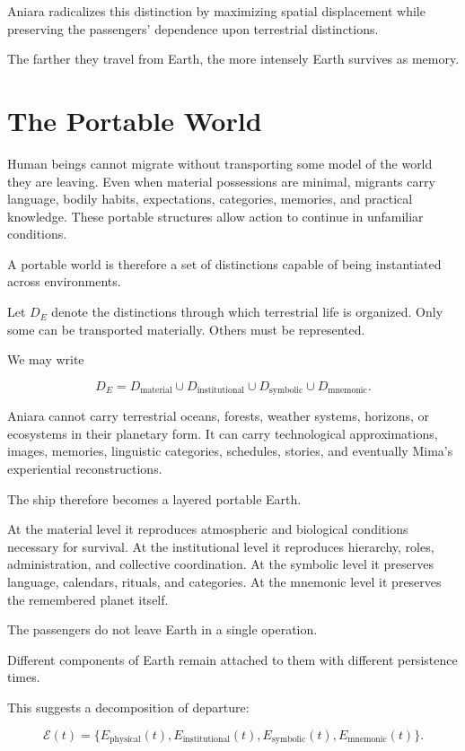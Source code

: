 \documentclass[11pt,oneside]{book}
\theoremstyle{definition}
\theoremstyle{remark}
\begin{document}
Aniara radicalizes this distinction by maximizing spatial displacement while preserving the passengers' dependence upon terrestrial distinctions.

The farther they travel from Earth, the more intensely Earth survives as memory.

\section{The Portable World}

Human beings cannot migrate without transporting some model of the world they are leaving. Even when material possessions are minimal, migrants carry language, bodily habits, expectations, categories, memories, and practical knowledge. These portable structures allow action to continue in unfamiliar conditions.

A portable world is therefore a set of distinctions capable of being instantiated across environments.

Let \(D_E\) denote the distinctions through which terrestrial life is organized. Only some can be transported materially. Others must be represented.

We may write

\[
D_E
=
D_{\mathrm{material}}
\cup
D_{\mathrm{institutional}}
\cup
D_{\mathrm{symbolic}}
\cup
D_{\mathrm{mnemonic}}.
\]

Aniara cannot carry terrestrial oceans, forests, weather systems, horizons, or ecosystems in their planetary form. It can carry technological approximations, images, memories, linguistic categories, schedules, stories, and eventually Mima's experiential reconstructions.

The ship therefore becomes a layered portable Earth.

At the material level it reproduces atmospheric and biological conditions necessary for survival. At the institutional level it reproduces hierarchy, roles, administration, and collective coordination. At the symbolic level it preserves language, calendars, rituals, and categories. At the mnemonic level it preserves the remembered planet itself.

The passengers do not leave Earth in a single operation.

Different components of Earth remain attached to them with different persistence times.

This suggests a decomposition of departure:

\[
\mathcal E(t)
=
\{
E_{\mathrm{physical}}(t),
E_{\mathrm{institutional}}(t),
E_{\mathrm{symbolic}}(t),
E_{\mathrm{mnemonic}}(t)
\}.
\]
\end{document}
